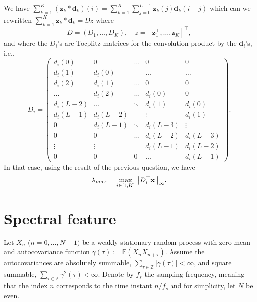 \documentclass[11pt]{article}
\begin{document}
\begin{solution}
We have $\sum_{k=1}^{K} (\mathbf{z}_k * \mathbf{d}_k)(i) = \sum_{k=1}^{K}\sum_{j=0}^{L-1}\mathbf{z}_k(j) \mathbf{d}_k(i-j)$ which can we rewritten $\sum_{k=1}^{K} \mathbf{z}_k* \mathbf{d}_k = Dz$ where
%
\begin{equation}
    D = (D_1, \ldots, D_K),\quad z=[\mathbf{z}_1^{\top}, \ldots, \mathbf{z}_K^{\top}]^{\top},
\end{equation}
%
and where the $D_i$'s are Toeplitz matrices for the convolution product by the $\mathbf{d}_i$'s, i.e.,
%
\begin{equation}
    D_i = \begin{pmatrix}
        d_i(0) & 0 & \ldots& 0 & 0\\
        d_i(1) & d_i(0) & &\hdots & \hdots\\
        d_i(2) & d_i(1) & \ldots & 0 & 0\\
        \hdots & d_i(2) & \ldots & d_i(0) & 0\\
        d_i(L-2) & \hdots &\ddots & d_i(1) & d_i(0)\\
        d_i(L-1) & d_i(L-2) & & \vdots & d_i(1)\\
        0 & d_i(L-1) &\ddots & d_i(L-3) & \vdots\\
        0 & 0 & \ldots & d_i(L-2) & d_i(L-3)\\
        \vdots & \vdots & & d_i(L-1) & d_i(L-2)\\
        0 & 0& 0 &\ldots & d_i(L-1)

    \end{pmatrix}.
\end{equation}
%
In that case, using the result of the previous question, we have
%
\begin{equation}
    \lambda_{max} = \max_{i\in[1, K]}{\left\lVert D_i^{\top}\mathbf{x}\right\rVert_{\infty}}.
\end{equation}
%
\end{solution}

\section{Spectral feature}

Let $X_n$ ($n=0,\dots,N-1)$ be a weakly stationary random process with zero mean and autocovariance function $\gamma(\tau):= \mathbb{E}(X_n X_{n+\tau})$.
Assume the autocovariances are absolutely summable, \ie $\sum_{\tau\in\mathbb{Z}} |\gamma(\tau)| < \infty$, and square summable, \ie $\sum_{\tau\in\mathbb{Z}} \gamma^2(\tau) < \infty$.
Denote by $f_s$ the sampling frequency, meaning that the index $n$ corresponds to the time instant $n / f_s$ and for simplicity, let $N$ be even.
\end{document}
